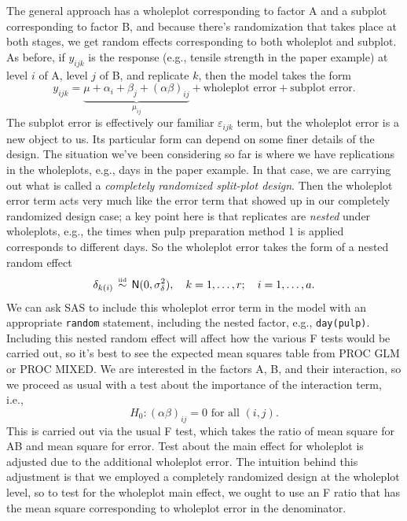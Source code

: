 \documentclass[a4paper, 12pt]{article}
\theoremstyle{plain}
\theoremstyle{definition}
\theoremstyle{remark}
\newcommand{\eps}{\varepsilon}
\newcommand{\nm}{\mathsf{N}}
\newcommand{\iid}{\overset{\text{\tiny iid}}{\,\sim\,}}
\begin{document}
The general approach has a wholeplot corresponding to factor A and a subplot corresponding to factor B, and because there's randomization that takes place at both stages, we get random effects corresponding to both wholeplot and subplot.  As before, if $y_{ijk}$ is the response (e.g., tensile strength in the paper example) at level $i$ of A, level $j$ of B, and replicate $k$, then the model takes the form 
\[ y_{ijk} = \underbrace{\mu + \alpha_i + \beta_j + (\alpha\beta)_{ij}}_{\mu_{ij}} + \text{wholeplot error} + \text{subplot error}. \]
The subplot error is effectively our familiar $\eps_{ijk}$ term, but the wholeplot error is a new object to us.  Its particular form can depend on some finer details of the design.  The situation we've been considering so far is where we have replications in the wholeplots, e.g., days in the paper example.  In that case, we are carrying out what is called a {\em completely randomized split-plot design}.  Then the wholeplot error term acts very much like the error term that showed up in our completely randomized design case; a key point here is that replicates are {\em nested} under wholeplots, e.g., the times when pulp preparation method 1 is applied corresponds to different days.  So the wholeplot error takes the form of a nested random effect
\[ \delta_{k(i)} \iid \nm(0, \sigma_\delta^2), \quad k=1,\ldots,r; \quad i=1,\ldots,a. \]
We can ask SAS to include this wholeplot error term in the model with an appropriate {\tt random} statement, including the nested factor, e.g., {\tt day(pulp)}.  Including this nested random effect will affect how the various F tests would be carried out, so it's best to see the expected mean squares table from PROC GLM or PROC MIXED.  We are interested in the factors A, B, and their interaction, so we proceed as usual with a test about the importance of the interaction term, i.e., 
\[ H_0: (\alpha\beta)_{ij} = 0 \text{ for all $(i,j)$}. \]
This is carried out via the usual F test, which takes the ratio of mean square for AB and mean square for error.  Test about the main effect for wholeplot is adjusted due to the additional wholeplot error.  The intuition behind this adjustment is that we employed a completely randomized design at the wholeplot level, so to test for the wholeplot main effect, we ought to use an F ratio that has the mean square corresponding to wholeplot error in the denominator.  
\end{document}
